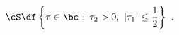 \begin{equation}
\cS \df \left\{\tau \in \bc~;~ \tau_2>0,~ 
|\tau_1|\leq \frac{1}{2}\right\}~.
\label{strip}
\end{equation}

